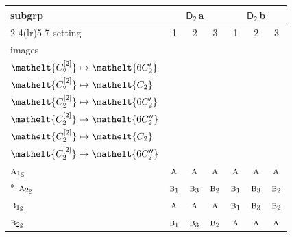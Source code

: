 \documentclass[10pt,a4paper]{article}
\numberwithin{equation}{section}
\newcommand{\eltfont}[1]{{\let\sigma\eltsigma\mathelt{#1}}}
\newcommand{\grp}[1]{\mathsf{#1}}
\newcommand{\irr}[1]{\text{\normalfont\scshape #1}}
\newcommand{\cls}[1]{\eltfont{#1}}
\newcommand{\ptag}[1]{\mathrm{#1}}
\newcommand{\clsletter}[1]{\,{\scriptsize\color{black!55}#1}}
\newcommand{\genidx}[2]{#1^{[\mathrm{#2}]}}
\begin{document}
{\small\begin{longtable}{@{}lcccccc@{}}\toprule
subgrp & \multicolumn{3}{c}{\href{D2.pdf}{$\grp{D_{2}}$}\clsletter{a}} & \multicolumn{3}{c}{\href{D2.pdf}{$\grp{D_{2}}$}\clsletter{b}}\\\cmidrule(lr){2-4}\cmidrule(lr){5-7}
setting & 1 & 2 & 3 & 1 & 2 & 3\\
images & {\scriptsize\begin{tabular}[t]{@{}c@{}}$\cls{\genidx{C_{2}}{1}} \mapsto \cls{C_{2}}$\\$\cls{\genidx{C_{2}}{2}} \mapsto \cls{6C_{2}'}$\end{tabular}} & {\scriptsize\begin{tabular}[t]{@{}c@{}}$\cls{\genidx{C_{2}}{1}} \mapsto \cls{6C_{2}'}$\\$\cls{\genidx{C_{2}}{2}} \mapsto \cls{C_{2}}$\end{tabular}} & {\scriptsize\begin{tabular}[t]{@{}c@{}}$\cls{\genidx{C_{2}}{1}} \mapsto \cls{6C_{2}'}$\\$\cls{\genidx{C_{2}}{2}} \mapsto \cls{6C_{2}'}$\end{tabular}} & {\scriptsize\begin{tabular}[t]{@{}c@{}}$\cls{\genidx{C_{2}}{1}} \mapsto \cls{C_{2}}$\\$\cls{\genidx{C_{2}}{2}} \mapsto \cls{6C_{2}''}$\end{tabular}} & {\scriptsize\begin{tabular}[t]{@{}c@{}}$\cls{\genidx{C_{2}}{1}} \mapsto \cls{6C_{2}''}$\\$\cls{\genidx{C_{2}}{2}} \mapsto \cls{C_{2}}$\end{tabular}} & {\scriptsize\begin{tabular}[t]{@{}c@{}}$\cls{\genidx{C_{2}}{1}} \mapsto \cls{6C_{2}''}$\\$\cls{\genidx{C_{2}}{2}} \mapsto \cls{6C_{2}''}$\end{tabular}}\\\midrule\endhead
\bottomrule\endfoot\endlastfoot
$\irr{a}_{1\ptag{g}}$ & $\irr{a}$ & $\irr{a}$ & $\irr{a}$ & $\irr{a}$ & $\irr{a}$ & $\irr{a}$\\*
$\irr{a}_{2\ptag{g}}$ & $\irr{b}_{1}$ & $\irr{b}_{3}$ & $\irr{b}_{2}$ & $\irr{b}_{1}$ & $\irr{b}_{3}$ & $\irr{b}_{2}$\\
$\irr{b}_{1\ptag{g}}$ & $\irr{a}$ & $\irr{a}$ & $\irr{a}$ & $\irr{b}_{1}$ & $\irr{b}_{3}$ & $\irr{b}_{2}$\\
$\irr{b}_{2\ptag{g}}$ & $\irr{b}_{1}$ & $\irr{b}_{3}$ & $\irr{b}_{2}$ & $\irr{a}$ & $\irr{a}$ & $\irr{a}$\\

\end{longtable}}
\end{document}
